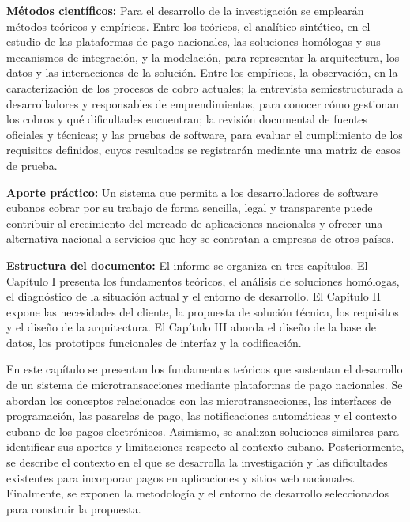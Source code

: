 \documentclass[12pt]{article}
\newcommand\doceUnoCinco{\fontsize{12bp}{20.7bp}\selectfont}      %
\newcommand\vacio{\leavevmode\par}
\newcommand\seccion[5]{%
  \newgeometry{left=56.7bp,right=56.7bp,top=#1,bottom=#3,
               headheight=13bp,headsep=#2,footskip=#4}%
  \setlength{\topskip}{#5}}
\newcommand\textoEncabezado{}
\begin{document}
\textbf{Métodos científicos:} Para el desarrollo de la investigación se emplearán métodos teóricos y empíricos. Entre los teóricos, el analítico-sintético, en el estudio de las plataformas de pago nacionales, las soluciones homólogas y sus mecanismos de integración, y la modelación, para representar la arquitectura, los datos y las interacciones de la solución. Entre los empíricos, la observación, en la caracterización de los procesos de cobro actuales; la entrevista semiestructurada a desarrolladores y responsables de emprendimientos, para conocer cómo gestionan los cobros y qué dificultades encuentran; la revisión documental de fuentes oficiales y técnicas; y las pruebas de software, para evaluar el cumplimiento de los requisitos definidos, cuyos resultados se registrarán mediante una matriz de casos de prueba.

\textbf{Aporte práctico:} Un sistema que permita a los desarrolladores de software cubanos cobrar por su trabajo de forma sencilla, legal y transparente puede contribuir al crecimiento del mercado de aplicaciones nacionales y ofrecer una alternativa nacional a servicios que hoy se contratan a empresas de otros países.

\textbf{Estructura del documento:} El informe se organiza en tres capítulos. El Capítulo I presenta los fundamentos teóricos, el análisis de soluciones homólogas, el diagnóstico de la situación actual y el entorno de desarrollo. El Capítulo II expone las necesidades del cliente, la propuesta de solución técnica, los requisitos y el diseño de la arquitectura. El Capítulo III aborda el diseño de la base de datos, los prototipos funcionales de interfaz y la codificación.

{\fontsize{11bp}{13.65bp}\selectfont\vacio\vacio}

\seccion{70.75bp}{2.55bp}{87.54bp}{28.72bp}{11.25bp}
\renewcommand\textoEncabezado{Capítulo I}
\doceUnoCinco
\setlength{\parskip}{0pt}


En este capítulo se presentan los fundamentos teóricos que sustentan el desarrollo de un sistema de microtransacciones mediante plataformas de pago nacionales. Se abordan los conceptos relacionados con las microtransacciones, las interfaces de programación, las pasarelas de pago, las notificaciones automáticas y el contexto cubano de los pagos electrónicos. Asimismo, se analizan soluciones similares para identificar sus aportes y limitaciones respecto al contexto cubano. Posteriormente, se describe el contexto en el que se desarrolla la investigación y las dificultades existentes para incorporar pagos en aplicaciones y sitios web nacionales. Finalmente, se exponen la metodología y el entorno de desarrollo seleccionados para construir la propuesta.
\end{document}
